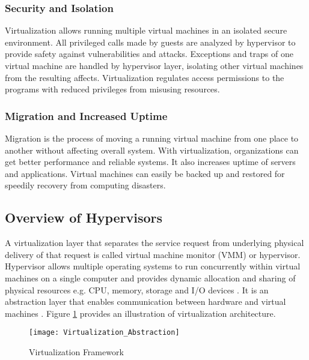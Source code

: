 \subsubsection{Security and Isolation\label{sec:security}}
Virtualization allows running multiple virtual machines in an isolated secure environment. All privileged calls made by guests are analyzed by hypervisor to provide safety against vulnerabilities and attacks. Exceptions and traps of one virtual machine are handled by hypervisor layer, isolating other virtual machines from the resulting affects. Virtualization regulates access permissions to the programs with reduced privileges from misusing resources. 

\subsubsection{Migration and Increased Uptime\label{sec:migration}}
Migration is the process of moving a running virtual machine from one place to another without affecting overall system. With virtualization, organizations can get better performance and reliable systems. It also increases uptime of servers and applications. Virtual machines can easily be backed up and restored for speedily recovery from computing disasters.

\subsection{Overview of Hypervisors\label{sec:aaa}}

A virtualization layer that separates the service request from underlying physical delivery of that request is called virtual machine monitor (VMM) or hypervisor. Hypervisor allows multiple operating systems to run concurrently within virtual machines on a single computer and provides dynamic allocation and sharing of physical resources e.g. CPU, memory, storage and I/O devices \cite{hypervisor1}. It is an abstraction layer that enables communication between hardware and virtual machines \cite{hypervisor2}. Figure \ref{Virtualization1} provides an illustration of virtualization architecture.

\begin{figure}[htb]
\centering
\texttt{[image: Virtualization\_Abstraction]}
\caption{Virtualization Framework}
\label{Virtualization1}
\end{figure}

